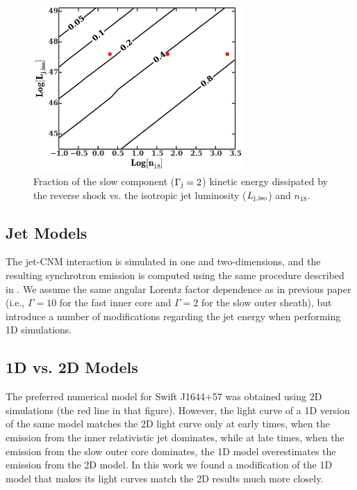 \documentclass[usenatbib,fleqn]{mnras}
\begin{document}
\begin{figure}
\includegraphics[width=8cm]{diss.pdf}
\caption{\label{fig:diss} Fraction of the slow component
  ($\Gamma_{\rm j}=2$) kinetic energy dissipated by the reverse shock
  vs. the isotropic jet luminosity ($L_{\rm j,iso}$) and $n_{18}$.}
\end{figure}

\subsection{Jet Models}
\label{sec:numerical}

The jet-CNM interaction is simulated in one and two-dimensions, and
the resulting synchrotron emission is computed using the same
procedure described in \citet{Mimica+2015}. We assume the same angular
Lorentz factor dependence as in previous paper (i.e., $\Gamma = 10$
for the fast inner core and $\Gamma = 2$ for the slow outer sheath),
but introduce a number of modifications regarding the jet energy
when performing 1D simulations.

\subsection{1D vs. 2D Models}
\label{sec:2D}

The preferred numerical model for Swift J1644+57 \citep[Fig.10
in][]{Mimica+2015} was obtained using 2D simulations (the red line in
that figure). However, the light curve of a 1D version of the same
model \citep[black line in Fig. 10 in][see also section 4.2 of that
paper]{Mimica+2015} matches the 2D light curve only at early times,
when the emission from the inner relativistic jet dominates, while at
late times, when the emission from the slow outer core dominates, the
1D model overestimates the emission from the 2D model. In this work we
found a modification of the 1D model that makes its light curves
match the 2D results much more closely.
\end{document}

